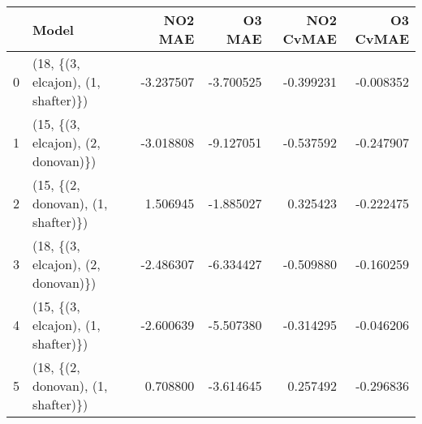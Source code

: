 \begin{tabular}{llrrrr}
\toprule
{} &                               Model &   NO2 MAE &    O3 MAE &  NO2 CvMAE &  O3 CvMAE \\
\midrule
0 &  (18, \{(3, elcajon), (1, shafter)\}) & -3.237507 & -3.700525 &  -0.399231 & -0.008352 \\
1 &  (15, \{(3, elcajon), (2, donovan)\}) & -3.018808 & -9.127051 &  -0.537592 & -0.247907 \\
2 &  (15, \{(2, donovan), (1, shafter)\}) &  1.506945 & -1.885027 &   0.325423 & -0.222475 \\
3 &  (18, \{(3, elcajon), (2, donovan)\}) & -2.486307 & -6.334427 &  -0.509880 & -0.160259 \\
4 &  (15, \{(3, elcajon), (1, shafter)\}) & -2.600639 & -5.507380 &  -0.314295 & -0.046206 \\
5 &  (18, \{(2, donovan), (1, shafter)\}) &  0.708800 & -3.614645 &   0.257492 & -0.296836 \\
\bottomrule
\end{tabular}
